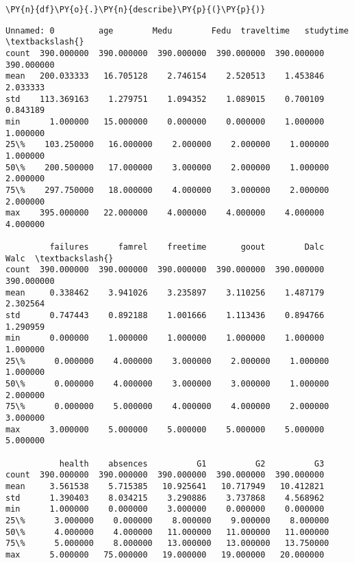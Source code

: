     \begin{tcolorbox}[breakable, size=fbox, boxrule=1pt, pad at break*=1mm,colback=cellbackground, colframe=cellborder]
\begin{Verbatim}[commandchars=\\\{\}]
\PY{n}{df}\PY{o}{.}\PY{n}{describe}\PY{p}{(}\PY{p}{)}
\end{Verbatim}
\end{tcolorbox}

            \begin{tcolorbox}[breakable, size=fbox, boxrule=.5pt, pad at break*=1mm, opacityfill=0]
\begin{Verbatim}[commandchars=\\\{\}]
       Unnamed: 0         age        Medu        Fedu  traveltime   studytime  \textbackslash{}
count  390.000000  390.000000  390.000000  390.000000  390.000000  390.000000
mean   200.033333   16.705128    2.746154    2.520513    1.453846    2.033333
std    113.369163    1.279751    1.094352    1.089015    0.700109    0.843189
min      1.000000   15.000000    0.000000    0.000000    1.000000    1.000000
25\%    103.250000   16.000000    2.000000    2.000000    1.000000    1.000000
50\%    200.500000   17.000000    3.000000    2.000000    1.000000    2.000000
75\%    297.750000   18.000000    4.000000    3.000000    2.000000    2.000000
max    395.000000   22.000000    4.000000    4.000000    4.000000    4.000000

         failures      famrel    freetime       goout        Dalc        Walc  \textbackslash{}
count  390.000000  390.000000  390.000000  390.000000  390.000000  390.000000
mean     0.338462    3.941026    3.235897    3.110256    1.487179    2.302564
std      0.747443    0.892188    1.001666    1.113436    0.894766    1.290959
min      0.000000    1.000000    1.000000    1.000000    1.000000    1.000000
25\%      0.000000    4.000000    3.000000    2.000000    1.000000    1.000000
50\%      0.000000    4.000000    3.000000    3.000000    1.000000    2.000000
75\%      0.000000    5.000000    4.000000    4.000000    2.000000    3.000000
max      3.000000    5.000000    5.000000    5.000000    5.000000    5.000000

           health    absences          G1          G2          G3
count  390.000000  390.000000  390.000000  390.000000  390.000000
mean     3.561538    5.715385   10.925641   10.717949   10.412821
std      1.390403    8.034215    3.290886    3.737868    4.568962
min      1.000000    0.000000    3.000000    0.000000    0.000000
25\%      3.000000    0.000000    8.000000    9.000000    8.000000
50\%      4.000000    4.000000   11.000000   11.000000   11.000000
75\%      5.000000    8.000000   13.000000   13.000000   13.750000
max      5.000000   75.000000   19.000000   19.000000   20.000000
\end{Verbatim}
\end{tcolorbox}
        
